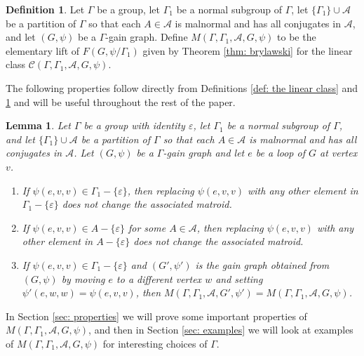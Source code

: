 \documentclass[12pt]{article}
\newtheorem{lemma}[theorem]{Lemma}
\theoremstyle{definition}
\newtheorem{definition}[theorem]{Definition}
\newcommand{\cA}{\mathcal{A}}
\newcommand{\cC}{\mathcal{C}}
\newcommand{\ep}{\varepsilon}
\begin{document}
\begin{definition} \label{def: the matroid}
Let $\Gamma$ be a group, let $\Gamma_1$ be a normal subgroup of $\Gamma$, let $\{\Gamma_1\} \cup \cA$ be a partition of $\Gamma$ so that each $A \in \cA$ is malnormal and has all conjugates in $\cA$, and let $(G, \psi)$ be a $\Gamma$-gain graph.
Define $M(\Gamma, \Gamma_1, \cA, G, \psi)$ to be the elementary lift of $F(G, \psi/\Gamma_1)$ given by Theorem \ref{thm: brylawski} for the linear class $\cC(\Gamma, \Gamma_1, \cA, G, \psi)$.
\end{definition}


The following properties follow directly from Definitions \ref{def: the linear class} and \ref{def: the matroid} and will be useful throughout the rest of the paper.

\begin{lemma} \label{lem: placement of loops}
Let $\Gamma$ be a group with identity $\ep$, let $\Gamma_1$ be a normal subgroup of $\Gamma$, and let $\{\Gamma_1\} \cup \cA$ be a partition of $\Gamma$ so that each $A \in \cA$ is malnormal and has all conjugates in $\cA$.
Let $(G, \psi)$ be a $\Gamma$-gain graph and let $e$ be a loop of $G$ at vertex $v$. 
\begin{enumerate}[label=$(\alph*)$]
    \item If $\psi(e, v, v) \in \Gamma_1 - \{\ep\}$, then replacing $\psi(e, v, v)$ with any other element in $\Gamma_1 - \{\ep\}$ does not change the associated matroid.

    \item If $\psi(e, v, v) \in A - \{\ep\}$ for some $A \in \cA$, then replacing $\psi(e, v, v)$ with any other element in $A - \{\ep\}$ does not change the associated matroid.

    \item If $\psi(e, v, v) \in \Gamma_1 - \{\ep\}$ and $(G', \psi')$ is the gain graph obtained from $(G, \psi)$ by moving $e$ to a different vertex $w$ and setting $\psi'(e, w, w) = \psi(e, v, v)$, then $M(\Gamma, \Gamma_1, \cA, G', \psi') = M(\Gamma, \Gamma_1, \cA, G, \psi)$.
\end{enumerate}
\end{lemma}


In Section \ref{sec: properties} we will prove some important properties of $M(\Gamma, \Gamma_1, \cA, G, \psi)$, and then in Section \ref{sec: examples} we will look at examples of $M(\Gamma, \Gamma_1, \cA, G, \psi)$ for interesting choices of $\Gamma$. 
\end{document}
